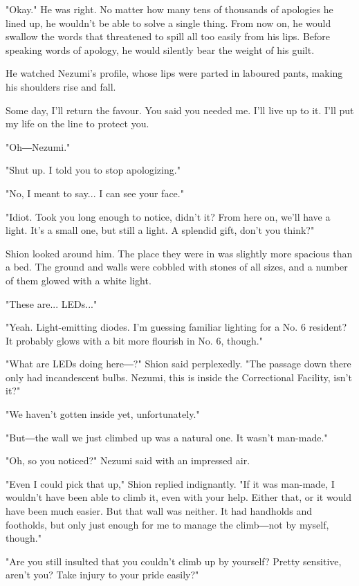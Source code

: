 "Okay." He was right. No matter how many tens of thousands of apologies
he lined up, he wouldn't be able to solve a single thing. From now on,
he would swallow the words that threatened to spill all too easily from
his lips. Before speaking words of apology, he would silently bear the
weight of his guilt.

He watched Nezumi's profile, whose lips were parted in laboured pants,
making his shoulders rise and fall.

Some day, I'll return the favour. You said you needed me. I'll live up
to it. I'll put my life on the line to protect you.

"Oh―Nezumi."

"Shut up. I told you to stop apologizing."

"No, I meant to say... I can see your face."

"Idiot. Took you long enough to notice, didn't it? From here on, we'll
have a light. It's a small one, but still a light. A splendid gift,
don't you think?"

Shion looked around him. The place they were in was slightly more
spacious than a bed. The ground and walls were cobbled with stones of
all sizes, and a number of them glowed with a white light.

"These are... LEDs..."

"Yeah. Light-emitting diodes. I'm guessing familiar lighting for a No. 6
resident? It probably glows with a bit more flourish in No. 6, though."

"What are LEDs doing here―?" Shion said perplexedly. "The passage down
there only had incandescent bulbs. Nezumi, this is inside the
Correctional Facility, isn't it?"

"We haven't gotten inside yet, unfortunately."

"But―the wall we just climbed up was a natural one. It wasn't man-made."

"Oh, so you noticed?" Nezumi said with an impressed air.

"Even I could pick that up," Shion replied indignantly. "If it was
man-made, I wouldn't have been able to climb it, even with your help.
Either that, or it would have been much easier. But that wall was
neither. It had handholds and footholds, but only just enough for me to
manage the climb―not by myself, though."

"Are you still insulted that you couldn't climb up by yourself? Pretty
sensitive, aren't you? Take injury to your pride easily?"

